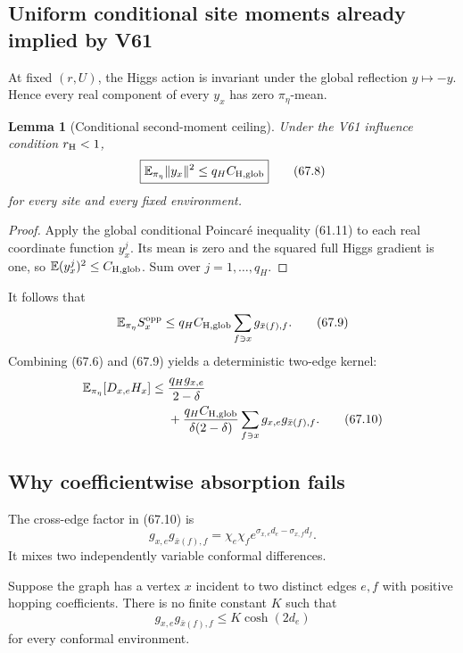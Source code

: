 \documentclass[11pt]{article}
\newtheorem{lemma}[theorem]{Lemma}
\theoremstyle{remark}
\begin{document}
\subsection{Uniform conditional site moments already implied by V61}

At fixed \((r,U)\), the Higgs action is invariant under the global
reflection \(y\mapsto-y\).  Hence every real component of every
\(y_x\) has zero \(\pi_\eta\)-mean.

\begin{lemma}[Conditional second-moment ceiling]
\label{lem:v17v67-moment}
Under the V61 influence condition \(r_{\rm H}<1\),
\[
\boxed{
 \mathbb E_{\pi_\eta}\|y_x\|^2
 \leq q_H C_{\rm H,glob}}                        \tag{67.8}
\]
for every site and every fixed environment.
\end{lemma}

\begin{proof}
Apply the global conditional Poincar\'e inequality (61.11) to each
real coordinate function \(y_x^j\).  Its mean is zero and the squared
full Higgs gradient is one, so
\(\mathbb E(y_x^j)^2\leq C_{\rm H,glob}\).  Sum over
\(j=1,\ldots,q_H\).
\end{proof}

It follows that
\[
 \mathbb E_{\pi_\eta}S_x^{\rm opp}
 \leq q_HC_{\rm H,glob}
 \sum_{f\ni x}g_{\bar x(f),f}.                  \tag{67.9}
\]
Combining (67.6) and (67.9) yields a deterministic two-edge kernel:
\[
\begin{aligned}
 \mathbb E_{\pi_\eta}[D_{x,e}H_x]
 \leq{}&\frac{q_Hg_{x,e}}{2-\delta}\\
 &+\frac{q_HC_{\rm H,glob}}
 {\delta(2-\delta)}
 \sum_{f\ni x}g_{x,e}g_{\bar x(f),f}.           \tag{67.10}
\end{aligned}
\]

\subsection{Why coefficientwise absorption fails}

The cross-edge factor in (67.10) is
\[
 g_{x,e}g_{\bar x(f),f}
 =\chi_e\chi_f
 e^{\sigma_{x,e}d_e-\sigma_{x,f}d_f}.            \tag{67.11}
\]
It mixes two independently variable conformal differences.

\begin{countertheorem}
\label{ctr:v17v67-edgewise}
Suppose the graph has a vertex \(x\) incident to two distinct edges
\(e,f\) with positive hopping coefficients.  There is no finite
constant \(K\) such that
\[
 g_{x,e}g_{\bar x(f),f}
 \leq K\cosh(2d_e)                                \tag{67.12}
\]
for every conformal environment.
\end{countertheorem}
\end{document}
